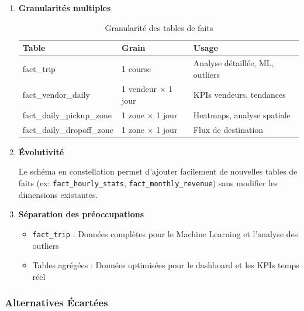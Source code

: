 \documentclass[12pt,a4paper]{report}
\begin{document}
\begin{enumerate}
    Les tables de faits agrégées (\texttt{fact\_vendor\_daily}, \texttt{fact\_daily\_*\_zone}) pré-calculent les métriques courantes, réduisant drastiquement le temps de réponse pour les requêtes du dashboard.

    \item \textbf{Granularités multiples}

    \begin{table}[H]
    \centering
    \caption{Granularité des tables de faits}
    \begin{tabular}{@{}lll@{}}
    \toprule
    \textbf{Table} & \textbf{Grain} & \textbf{Usage} \\
    \midrule
    fact\_trip & 1 course & Analyse détaillée, ML, outliers \\
    fact\_vendor\_daily & 1 vendeur $\times$ 1 jour & KPIs vendeurs, tendances \\
    fact\_daily\_pickup\_zone & 1 zone $\times$ 1 jour & Heatmaps, analyse spatiale \\
    fact\_daily\_dropoff\_zone & 1 zone $\times$ 1 jour & Flux de destination \\
    \bottomrule
    \end{tabular}
    \end{table}

    \item \textbf{Évolutivité}

    Le schéma en constellation permet d'ajouter facilement de nouvelles tables de faits (ex: \texttt{fact\_hourly\_stats}, \texttt{fact\_monthly\_revenue}) sans modifier les dimensions existantes.

    \item \textbf{Séparation des préoccupations}

    \begin{itemize}
        \item \texttt{fact\_trip} : Données complètes pour le Machine Learning et l'analyse des outliers
        \item Tables agrégées : Données optimisées pour le dashboard et les KPIs temps réel
    \end{itemize}
\end{enumerate}

\subsubsection{Alternatives Écartées}
\end{document}
